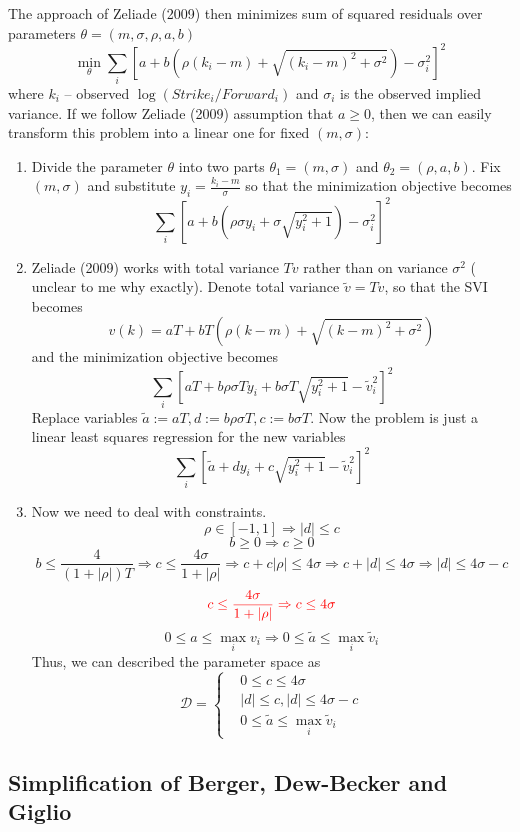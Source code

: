 \documentclass[12pt]{article}
\begin{document}
The approach of Zeliade (2009) then minimizes sum of squared residuals over parameters $\theta = (m, \sigma, \rho, a, b)$
\[\min_{\theta} \sum_{i} \left[a + b\left(\rho (k_i-m) + \sqrt{(k_i-m)^2 + \sigma^2}\right) - \sigma_i^2\right]^2\]
where $k_i$ -- observed $\log(Strike_i/Forward_i)$ and $\sigma_i$ is the observed implied variance. If we follow Zeliade (2009) assumption that $a \ge 0$, then we can easily transform this problem into a linear one for fixed $(m,\sigma)$:
\begin{enumerate}
	\item Divide the parameter $\theta$ into two parts $\theta_1 = (m,\sigma)$ and $\theta_2 = (\rho,a,b)$. Fix $(m,\sigma)$ and substitute $y_i = \frac{k_i - m}{\sigma}$ so that the minimization objective becomes
	\[\sum_{i} \left[a + b\left(\rho \sigma y_i + \sigma\sqrt{y_i^2 + 1}\right) - \sigma_i^2\right]^2\]
	\item Zeliade (2009) works with total variance $Tv$ rather than on variance $\sigma^2$ ({\color{red} unclear to me why exactly}). Denote total variance $\tilde{v} = Tv$, so that the SVI becomes 
	\[v(k) = aT + bT\left(\rho (k-m) + \sqrt{(k-m)^2 + \sigma^2}\right)\]
	and the minimization objective becomes
	\[\sum_{i} \left[aT + b\rho \sigma T y_i + b \sigma T\sqrt{y_i^2 + 1} - \tilde{v}_i^2\right]^2\]
	Replace variables $\tilde{a} := aT, d := b\rho \sigma T, c := b\sigma T$. Now the problem is just a linear least squares regression for the new variables
	\[\sum_{i} \left[\tilde{a} + d y_i + c\sqrt{y_i^2 + 1} - \tilde{v}_i^2\right]^2\]
	\item Now we need to deal with constraints.
	\[\rho \in [-1,1] \Rightarrow |d| \le c\]
	\[b \ge 0 \Rightarrow c \ge 0\]
	\[b \le \frac{4}{(1+|\rho|)T} \Rightarrow c \le \frac{4\sigma}{1+|\rho|} \Rightarrow c + c|\rho| \le 4\sigma \Rightarrow c + |d| \le 4\sigma \Rightarrow |d| \le 4\sigma - c\]
	\[{\color{red} c \le \frac{4\sigma}{1+|\rho|} \Rightarrow c \le 4\sigma}\]
	\[0 \le a \le \max_{i}v_i \Rightarrow 0 \le \tilde{a} \le \max_i \tilde{v}_i\]
	Thus, we can described the parameter space as
	\[\mathcal{D} = \left\{
	\begin{aligned}
		& 0 \le c \le 4\sigma \\
		& |d| \le c, |d| \le 4\sigma - c \\
		& 0 \le \tilde{a} \le \max_i \tilde{v}_i
	\end{aligned}\right.\]

\end{enumerate}

\subsection{Simplification of Berger, Dew-Becker and Giglio}
\end{document}
